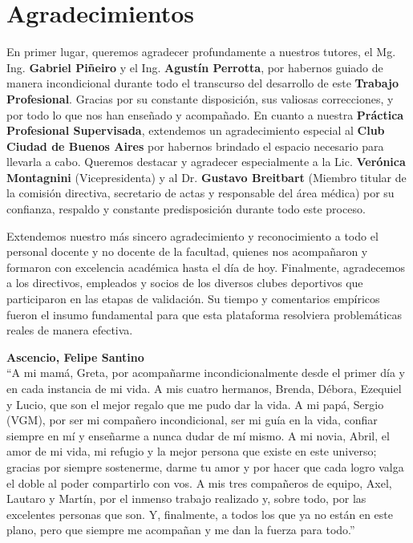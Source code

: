 \section{Agradecimientos}

En primer lugar, queremos agradecer profundamente a nuestros tutores, el Mg. Ing. \textbf{Gabriel Piñeiro} y el Ing. \textbf{Agustín Perrotta}, por habernos guiado de manera incondicional durante todo el transcurso del desarrollo de este \textbf{Trabajo Profesional}. Gracias por su constante disposición, sus valiosas correcciones, y por todo lo que nos han enseñado y acompañado. En cuanto a nuestra \textbf{Práctica Profesional Supervisada}, extendemos un agradecimiento especial al \textbf{Club Ciudad de Buenos Aires} por habernos brindado el espacio necesario para llevarla a cabo. Queremos destacar y agradecer especialmente a la Lic. \textbf{Verónica Montagnini} (Vicepresidenta) y al Dr. \textbf{Gustavo Breitbart} (Miembro titular de la comisión directiva, secretario de actas y responsable del área médica) por su confianza, respaldo y constante predisposición durante todo este proceso.

Extendemos nuestro más sincero agradecimiento y reconocimiento a todo el personal docente y no docente de la facultad, quienes nos acompañaron y formaron con excelencia académica hasta el día de hoy. Finalmente, agradecemos a los directivos, empleados y socios de los diversos clubes deportivos que participaron en las etapas de validación. Su tiempo y comentarios empíricos fueron el insumo fundamental para que esta plataforma resolviera problemáticas reales de manera efectiva.

\vspace{0.3cm}

\noindent \textbf{Ascencio, Felipe Santino} \\
``A mi mamá, Greta, por acompañarme incondicionalmente desde el primer día y en cada instancia de mi vida. A mis cuatro hermanos, Brenda, Débora, Ezequiel y Lucio, que son el mejor regalo que me pudo dar la vida. A mi papá, Sergio (VGM), por ser mi compañero incondicional, ser mi guía en la vida, confiar siempre en mí y enseñarme a nunca dudar de mí mismo. A mi novia, Abril, el amor de mi vida, mi refugio y la mejor persona que existe en este universo; gracias por siempre sostenerme, darme tu amor y por hacer que cada logro valga el doble al poder compartirlo con vos. A mis tres compañeros de equipo, Axel, Lautaro y Martín, por el inmenso trabajo realizado y, sobre todo, por las excelentes personas que son. Y, finalmente, a todos los que ya no están en este plano, pero que siempre me acompañan y me dan la fuerza para todo.''


